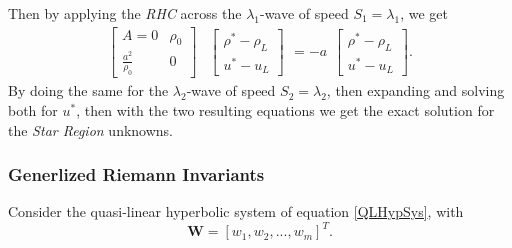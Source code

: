 \documentclass[]{article}
\begin{document}
			Then by applying the \textit{RHC} across the $ \lambda_1 $-wave of speed $ S_1 = \lambda_1 $, we get
			\begin{equation}						
				\begin{aligned}
				\left[
					\begin{array}{ll}
						A = 0 & \rho_0\\
						\frac{a^2}{\rho_0} & 0 
					\end{array}
				\right]
				\end{aligned}
				\begin{aligned}
				\left[
					\begin{array}{ll}
						\rho^*-\rho_L \\
						u^* - u_L
					\end{array}
				\right]
				\end{aligned} =
				-a			
				\begin{aligned}
				\left[
					\begin{array}{ll}
						\rho^*-\rho_L \\
						u^* - u_L
					\end{array}
				\right].
				\end{aligned}
			\end{equation}
			By doing the same for the $ \lambda_2 $-wave of speed $ S_2 = \lambda_2 $, then expanding and solving both for $ u^* $, then with the two resulting equations we get the exact solution for the \textit{Star Region} unknowns.
		\subsubsection{Generlized Riemann Invariants}
			Consider the quasi-linear hyperbolic system of equation \ref{QLHypSys}, with
			\begin{equation}
				\textbf{W} = [w_1, w_2,..., w_m]^T.
			\end{equation}
\end{document}
